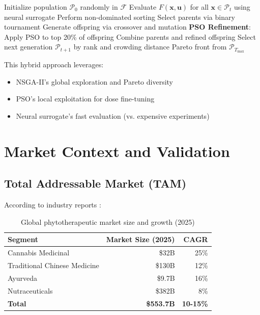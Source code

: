 \documentclass[12pt, a4paper]{article}
\begin{document}
\begin{algorithm}
\caption{SynPhytica Hybrid Optimizer}
\begin{algorithmic}[1]
\State Initialize population $\mathcal{P}_0$ randomly in $\mathcal{F}$
    \State Evaluate $F(\mathbf{x}, \mathbf{u})$ for all $\mathbf{x} \in \mathcal{P}_t$ using neural surrogate
    \State Perform non-dominated sorting
    \State Select parents via binary tournament
    \State Generate offspring via crossover and mutation
    \State \textbf{PSO Refinement}: Apply PSO to top 20\% of offspring
    \State Combine parents and refined offspring
    \State Select next generation $\mathcal{P}_{t+1}$ by rank and crowding distance
\EndFor
\State \Return Pareto front from $\mathcal{P}_{T_{\max}}$
\end{algorithmic}
\end{algorithm}

This hybrid approach leverages:
\begin{itemize}
    \item NSGA-II's global exploration and Pareto diversity
    \item PSO's local exploitation for dose fine-tuning
    \item Neural surrogate's fast evaluation (vs. expensive experiments)
\end{itemize}

\section{Market Context and Validation}

\subsection{Total Addressable Market (TAM)}

According to industry reports \citep{GrandView2025, Fortune2025}:

\begin{table}[h]
\centering
\begin{tabular}{lrr}
\toprule
\textbf{Segment} & \textbf{Market Size (2025)} & \textbf{CAGR} \\
\midrule
Cannabis Medicinal & \$32B & 25\% \\
Traditional Chinese Medicine & \$130B & 12\% \\
Ayurveda & \$9.7B & 16\% \\
Nutraceuticals & \$382B & 8\% \\
\midrule
\textbf{Total} & \textbf{\$553.7B} & \textbf{10-15\%} \\
\bottomrule
\end{tabular}
\caption{Global phytotherapeutic market size and growth (2025)}
\end{table}
\end{document}
